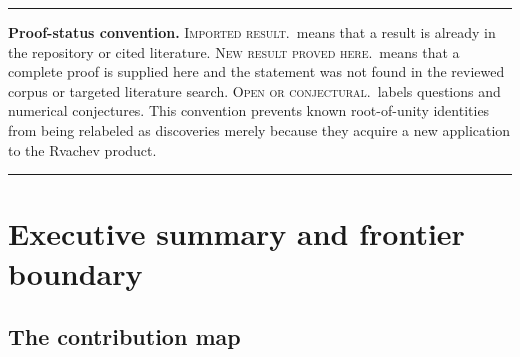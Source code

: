 \documentclass[11pt,oneside]{article}
\theoremstyle{definition}
\theoremstyle{remark}
\newcommand{\newresult}{\textcolor{newgreen}{\textsc{New result proved here.}}}
\newcommand{\imported}{\textcolor{importblue}{\textsc{Imported result.}}}
\newcommand{\openstatus}{\textcolor{conjectureorange}{\textsc{Open or conjectural.}}}
\newenvironment{boxedremark}{\par\smallskip\noindent\begin{center}\begin{minipage}{0.94\textwidth}\hrule\vspace{0.6em}\small}{\vspace{0.6em}\hrule\end{minipage}\end{center}\smallskip}
\begin{document}
\begin{boxedremark}
\textbf{Proof-status convention.}
\imported\ means that a result is already in the repository or cited literature.
\newresult\ means that a complete proof is supplied here and the statement was not
found in the reviewed corpus or targeted literature search. \openstatus\ labels
questions and numerical conjectures. This convention prevents known root-of-unity
identities from being relabeled as discoveries merely because they acquire a new
application to the Rvachev product.
\end{boxedremark}

\tableofcontents
\newpage

\section{Executive summary and frontier boundary}\label{sec:executive}

\subsection{The contribution map}
\end{document}
